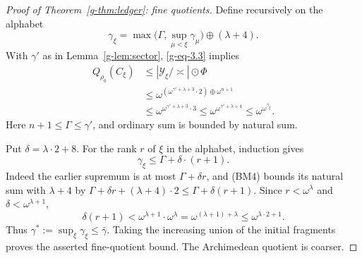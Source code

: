 \documentclass[11pt]{article}
\theoremstyle{definition}
\theoremstyle{remark}
\newcommand{\arch}{\mathrel{\asymp}}
\newcommand{\hs}{\mathbin{\oplus}}
\newcommand{\od}{\mathbin{\odot}}
\newcommand{\Ycal}{\mathcal Y}
\numberwithin{equation}{section}
\begin{document}
\begin{proof}[Proof of Theorem~\ref{g-thm:ledger}: fine quotients]
Define recursively on the alphabet
\begin{equation}
 \gamma_\xi=
 \max\bigl(\Gamma,\sup_{\mu<\xi}\gamma_\mu\bigr)\hs(\lambda+4).
 \label{g-eq-4.2}
\end{equation}
With $\gamma'$ as in Lemma~\ref{g-lem:sector}, \eqref{g-eq-3.3} implies
\[
 \begin{aligned}
 Q_{\rho_0}(C_\xi)
 &\le |\Ycal_\xi/\arch|\od\Phi\\
 &\le\omega^{(\omega^{\gamma'+\lambda+3}\cdot2)
                         \hs\omega^{n+1}}\\
 &\le\omega^{\omega^{\gamma'+\lambda+3}\cdot3}
 \le\omega^{\omega^{\gamma'+\lambda+4}}
 \le\omega^{\omega^{\gamma_\xi}}.
 \end{aligned}
\]
Here $n+1\le\Gamma\le\gamma'$, and ordinary sum is bounded by
natural sum.

Put $\delta=\lambda\cdot2+8$.
For the rank $r$ of $\xi$ in the alphabet, induction gives
\[
 \gamma_\xi\le\Gamma+\delta\cdot(r+1).
\]
Indeed the earlier supremum is at most $\Gamma+\delta r$,
and (BM4) bounds its natural sum with $\lambda+4$ by
$\Gamma+\delta r+(\lambda+4)\cdot2
 \le\Gamma+\delta(r+1)$.
Since $r<\omega^\lambda$ and $\delta<\omega^{\lambda+1}$,
\begin{equation}
 \delta(r+1)
 <\omega^{\lambda+1}\cdot\omega^\lambda
 =\omega^{(\lambda+1)+\lambda}
 \le\omega^{\lambda\cdot2+1}.
 \label{g-eq-4.3}
\end{equation}
Thus $\gamma^*:=\sup_\xi\gamma_\xi\le\bar\gamma$.
Taking the increasing union of the initial fragments proves
the asserted fine-quotient bound.  The Archimedean quotient is coarser.
\end{proof}
\end{document}
